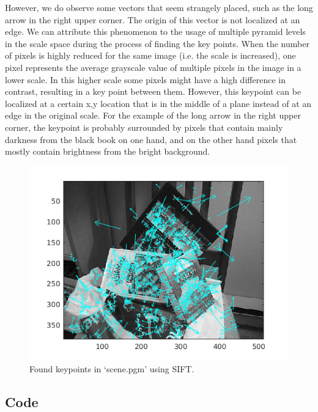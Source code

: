 \documentclass{article}
\begin{document}
However, we do observe some vectors that seem strangely placed, such as the long arrow in the right upper corner. The origin of this vector is not localized at an edge. We can attribute this phenomenon to the usage of multiple pyramid levels in the scale space during the process of finding the key points. When the number of pixels is highly reduced for the same image (i.e. the scale is increased), one pixel represents the average grayscale value of multiple pixels in the image in a lower scale. In this higher scale some pixels might have a high difference in contrast, resulting in a key point between them. However, this keypoint can be localized at a certain x,y location that is in the middle of a plane instead of at an edge in the original scale. For the example of the long arrow in the right upper corner, the keypoint is probably surrounded by pixels that contain mainly darkness from the black book on one hand, and on the other hand pixels that mostly contain brightness from the bright background. 
\begin{figure}[H]
 \centering
 \includegraphics[width=.7\textwidth]{keypoints.png}
 \caption{Found keypoints in `scene.pgm' using SIFT.}
 \label{fig1}
\end{figure}



\begin{appendices}
\section{Code}
\end{appendices}
\end{document}
